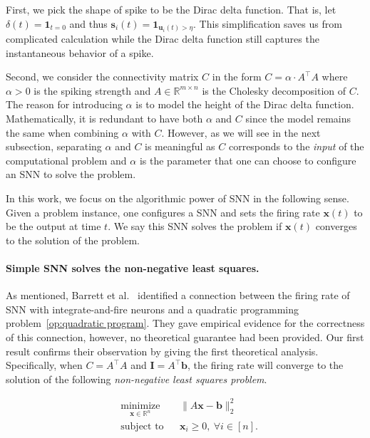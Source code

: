 \documentclass[11pt]{article}
\theoremstyle{remark}
\theoremstyle{definition}
\newcommand{\bx}{\mathbf{x}}
\newcommand{\bb}{\mathbf{b}}
\newcommand{\bI}{\mathbf{I}}
\newcommand{\bu}{\mathbf{u}}
\newcommand{\bs}{\mathbf{s}}
\newcommand{\R}{{\mathbb R}} %
\begin{document}
First, we pick the shape of spike to be the Dirac delta function. That is, let $\delta(t) = \mathbf{1}_{t=0}$ and thus $\bs_i(t)=\mathbf{1}_{\bu_i(t)>\eta}$. This simplification saves us from complicated calculation while the Dirac delta function still captures the instantaneous behavior of a spike.

Second, we consider the connectivity matrix $C$ in the form $C=\alpha\cdot A^\top A$ where $\alpha>0$ is the spiking strength and $A\in\R^{m\times n}$ is the Cholesky decomposition of $C$. The reason for introducing $\alpha$ is to model the height of the Dirac delta function. Mathematically, it is redundant to have both $\alpha$ and $C$ since the model remains the same when combining $\alpha$ with $C$. However, as we will see in the next subsection, separating $\alpha$ and $C$ is meaningful as $C$ corresponds to the \textit{input} of the computational problem and $\alpha$ is the parameter that one can choose to configure an SNN to solve the problem.

In this work, we focus on the algorithmic power of SNN in the following sense. Given a problem instance, one configures a SNN and sets the firing rate $\bx(t)$ to be the output at time $t$. We say this SNN solves the problem if $\bx(t)$ converges to the solution of the problem.


\paragraph{Simple SNN solves the non-negative least squares.} As mentioned, Barrett et al.~\cite{barrett2013firing} identified a connection between the firing rate of SNN with integrate-and-fire neurons and a quadratic programming problem~\eqref{op:quadratic program}. They gave empirical evidence for the correctness of this connection, however, no theoretical guarantee had been provided. Our first result confirms their observation by giving the first theoretical analysis. Specifically, when $C=A^\top A$ and $\bI=A^\top\bb$, the firing rate will converge to the solution of the following \textit{non-negative least squares problem}.

\begin{equation}\label{op:NNLS}
\begin{aligned}
& \underset{\bx\in\R^n}{\text{minimize}}
& & \|A\bx-\bb\|_2^2 \\
& \text{subject to}
& & \bx_i\geq0,\ \forall i\in[n].
\end{aligned}
\end{equation}
\end{document}

